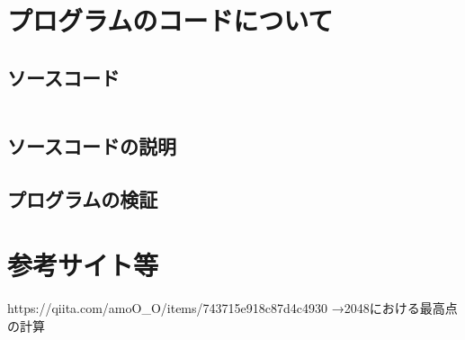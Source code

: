 \documentclass[11pt,a4paper]{jsarticle}
\begin{document}
\section{プログラムのコードについて}

\subsection{ソースコード}
\lstset{numbers=left}
\begin{lstlisting}

\end{lstlisting}
\subsection{ソースコードの説明}

\noindent
\subsection{プログラムの検証}
\noindent

\section{参考サイト等}
\noindent
https://qiita.com/amoO\_O/items/743715e918c87d4c4930
→2048における最高点の計算
\end{document}
